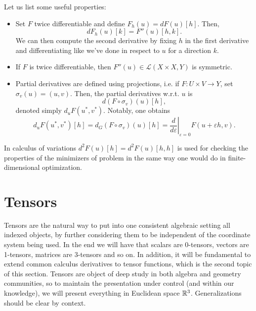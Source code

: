 Let us list some useful properties:
\begin{itemize}
    \item Set $F$ twice differentiable and define $F_h(u)=dF(u)[h]$. Then,
    \[ dF_h(u)[k] = F''(u)[h,k]. \] 
    We can then compute the second derivative by fixing $h$ in the first derivative and differentiating like we've done in respect to $u$ for a direction $k$.
    \item If $F$ is twice differentiable, then $F''(u)\in\mathcal{L}(X\times X, Y)$ is symmetric.
    \item Partial derivatives are defined using projections, i.e. if $F: U\times V \to Y$, set $\sigma_v(u)=(u,v)$. Then, the partial derivatives w.r.t. $u$ is
    \[ d(F\circ \sigma_v)(u)[h], \]
    denoted simply $d_u F(u^*,v^*)$. Notably, one obtains
    \[ d_u F(u^*,v^*)[h] = d_G(F\circ \sigma_v)(u)[h] = \left.\frac{d}{d\varepsilon}\right|_{\varepsilon = 0} F(u+\varepsilon h, v). \]
\end{itemize}


In calculus of variations $d^2 F(u)[h] = d^2 F(u)[h,h]$ is used for checking the properties of the minimizers of  problem in the same way one would do in finite-dimensional optimization.




\section{Tensors}
Tensors are the natural way to put into one consistent algebraic setting all indexed objects, by further considering them to be independent of the coordinate system being used. In the end we will have that scalars are 0-tensors, vectors are 1-tensors, matrices are 3-tensors and so on. In addition, it will be fundamental to extend common calculus derivatives to tensor functions, which is the second topic of this section. Tensors are object of deep study in both algebra and geometry communities, so to maintain the presentation under control (and within our knowledge), we will present everything in Euclidean space $\mathbb{R}^3$. Generalizations should be clear by context. 


